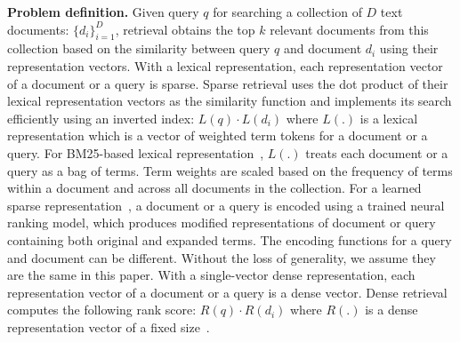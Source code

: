 \textbf{Problem definition.}
Given query $q$ for searching a collection of $D$ text documents:   $ \{d_i\}^D_{i=1}$, 
retrieval  obtains the top $k$ relevant documents from this collection based on
the similarity between query $q$ and document  $d_i$ using  their
representation vectors.
With a lexical representation, each  representation vector of a document or a query is sparse.
Sparse retrieval uses  the dot product of their lexical representation vectors as the similarity function
and implements its search efficiently using an inverted index: 
$L(q) \cdot  L(d_i)$
where $L(.)$ is a lexical representation   which is a vector of weighted term tokens for a document or a query.
For BM25-based lexical representation~\cite{Robertson2009BM25}, 
$L(.)$ treats each document or a query as a bag of terms.
Term weights are scaled based on the frequency of terms within a document and across all documents in the collection.
For a learned sparse representation~\cite{Dai2020deepct, Mallia2021deepimpact, Lin2021unicoil,2021NAACL-Gao-COIL}, 
a document or a query is encoded using  a trained neural ranking model, which
produces modified representations of document or query containing both original and expanded terms.
The encoding functions for a query and document can be different. Without the loss of generality, we assume they are the same in this paper.
With a single-vector dense  representation, each  representation vector of a document or a query is a dense vector. 
Dense retrieval computes the following rank score: 
$R(q) \cdot  R(d_i)$
where $R(.)$ is a dense representation vector  of a fixed size~\cite{Karpukhin2020DPR}.


